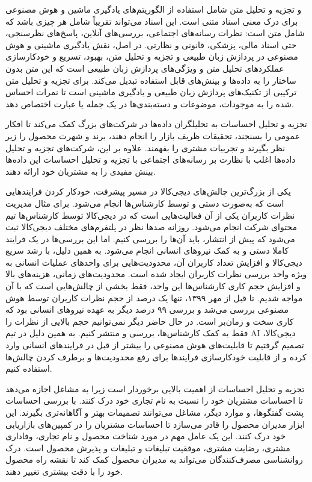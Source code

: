 

و تجزیه و تحلیل متن شامل استفاده از الگوریتم‌های یادگیری ماشین و هوش مصنوعی برای درک معنی اسناد متنی است.
این اسناد می‌تواند تقریباً شامل هر چیزی باشد که شامل متن است: نظرات رسانه‌های اجتماعی، بررسی‌های آنلاین، پاسخ‌های نظرسنجی، حتی اسناد مالی، پزشکی، قانونی و نظارتی. در اصل، نقش یادگیری ماشینی و هوش مصنوعی در پردازش زبان طبیعی و تجزیه و تحلیل متن، بهبود، تسریع و خودکارسازی عملکردهای تحلیل متن و ویژگی‌های پردازش زبان طبیعی است که این متن بدون ساختار را به داده‌ها و بینش‌های قابل استفاده تبدیل می‌کند.
 برای تجزیه و تحلیل متن ترکیبی از تکنیک‌های پردازش زبان طبیعی و یادگیری ماشینی است تا نمرات احساس شده را به موجودات، موضوعات و دسته‌بندی‌ها در یک جمله یا عبارت اختصاص دهد.

تجزیه و تحلیل احساسات به تحلیلگران داده‌ها در شرکت‌های بزرگ کمک می‌کند تا افکار عمومی را بسنجند، تحقیقات ظریف  بازار را انجام دهند، برند و شهرت محصول را زیر نظر بگیرند و تجربیات مشتری را بفهمند. علاوه بر این، شرکت‌های تجزیه و تحلیل داده‌ها اغلب با نظارت بر رسانه‌های اجتماعی با تجزیه و تحلیل احساسات این داده‌ها بینش مفیدی را به مشتریان خود ارائه دهند.
 
 
یکی از بزرگ‌ترین چالش‌های دیجی‌کالا در مسیر پیشرفت، خودکار کردن فرایندهایی است که به‌صورت دستی و توسط کارشناس‌ها انجام می‌شود. برای مثال مدیریت نظرات کاربران یکی از آن فعالیت‌هایی است که در دیجی‌کالا توسط کارشناس‌ها تیم محتوای شرکت انجام می‌شود. روزانه صدها نظر در پلتفرم‌های مختلف دیجی‌کالا ثبت می‌شود که پیش از انتشار، باید آن‌ها را بررسی کنیم. اما این بررسی‌ها در یک فرایند کاملا دستی و به کمک نیروهای انسانی انجام می‌شود. به همین دلیل، با رشد سریع دیجی‌کالا و افزایش تعداد کاربران آن، محدودیت‌هایی برای واحدهای عملیات انسانی به ویژه واحد بررسی نظرات کاربران ایجاد شده است. محدودیت‌های زمانی، هزینه‌های بالا و افزایش حجم کاری کارشناس‌ها این واحد، فقط بخشی از چالش‌هایی است که با آن مواجه شدیم.
تا قبل از مهر ۱۳۹۹، تنها یک درصد از حجم نظرات کاربران توسط هوش مصنوعی بررسی می‌شد و بررسی ۹۹ درصد دیگر به عهده نیروهای انسانی بود که کاری سخت و زمان‌بر است. در حال حاضر دیگر نمی‌توانیم حجم بالایی از نظرات را فقط به کمک کارشناس‌ها، بررسی و منتشر کنیم. به همین دلیل در تیم AI‌ دیجی‌کالا، تصمیم گرفتیم تا قابلیت‌های هوش مصنوعی را بیشتر از قبل در فرایندهای انسانی وارد کرده و از قابلیت خودکارسازی فرایندها برای رفع محدودیت‌ها و برطرف کردن چالش‌ها استفاده کنیم. 


 
 
تجزیه و تحلیل احساسات از اهمیت بالایی برخوردار است زیرا به مشاغل اجازه می‌دهد تا احساسات مشتریان خود را نسبت به نام تجاری خود درک کنند. با بررسی احساسات پشت گفتگوها، 
و موارد دیگر، مشاغل می‌توانند تصمیمات بهتر و آگاهانه‌تری بگیرند.
این ابزار مدیران محصول را قادر می‌سازد تا احساسات مشتریان را در کمپین‌های بازاریابی خود درک کنند. این یک عامل مهم در مورد
شناخت محصول و نام تجاری، وفاداری مشتری، رضایت مشتری، موفقیت تبلیغات و تبلیغات و پذیرش محصول است. درک روانشناسی مصرف‌کنندگان می‌تواند به مدیران محصول کمک کند تا نقشه راه محصول خود را با دقت بیشتری تغییر دهند.
\cite{medhat2014sentiment}
\cite{feldman2013techniques}

